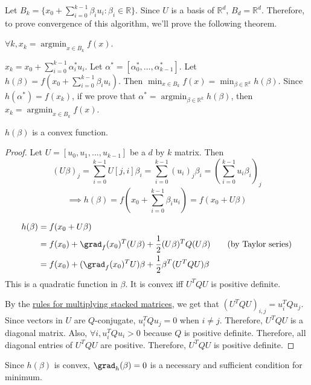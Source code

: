 Let $B_k = \{x_0 + \sum_{i=0}^{k-1} \beta_i u_i : \beta_i \in \mathbb{R} \}$.
Since $U$ is a basis of $\mathbb{R}^d$, $B_d = \mathbb{R}^d$.
Therefore, to prove convergence of this algorithm,
we'll prove the following theorem.

\begin{theorem}
\label{thm:exp-subsp}
$\forall k, x_k = \operatorname{argmin}_{x \in B_k} f(x)$.
\end{theorem}

$x_k = x_0 + \sum_{i=0}^{k-1} \alpha_i^* u_i$.
Let $\alpha^* = [\alpha_0^*, \ldots, \alpha_{k-1}^*]$.
Let $h(\beta) = f(x_0 + \sum_{i=0}^{k-1} \beta_i u_i)$.
Then $\min_{x \in B_k} f(x) = \min_{\beta \in \mathbb{R}^k} h(\beta)$.
Since $h(\alpha^*) = f(x_k)$, if we prove that
$\alpha^* = \operatorname{argmin}_{\beta \in \mathbb{R}^k} h(\beta)$,
then $x_k = \operatorname{argmin}_{x \in B_k} f(x)$.

\begin{lemma} $h(\beta)$ is a convex function. \end{lemma}
\begin{proof}
Let $U = [u_0, u_1, \ldots, u_{k-1}]$ be a $d$ by $k$ matrix. Then
\[ (U\beta)_j = \sum_{i=0}^{k-1} U[j, i] \beta_i
= \sum_{i=0}^{k-1} (u_i)_j \beta_i = \left( \sum_{i=0}^{k-1} u_i \beta_i \right)_j \]
\[ \implies h(\beta) = f\left(x_0 + \sum_{i=0}^{k-1} \beta_i u_i \right) = f(x_0 + U\beta) \]

\begin{align*}
h(\beta) &= f(x_0 + U\beta)
\\ &= f(x_0) + \grad_f(x_0)^T(U\beta) + \frac{1}{2}(U\beta)^T Q (U\beta) \tag{by Taylor series}
\\ &= f(x_0) + (\grad_f(x_0)^TU)\beta + \frac{1}{2}\beta^T (U^TQU) \beta
\end{align*}
This is a quadratic function in $\beta$.
It is convex iff $U^TQU$ is positive definite.

By the \href{https://sharmaeklavya2.github.io/theoremdep/nodes/linear-algebra/matrices/stacking/product.html}
{rules for multiplying stacked matrices}, we get that $(U^TQU)_{i,j} = u_i^TQu_j$.
Since vectors in $U$ are $Q$-conjugate, $u_i^TQu_j = 0$ when $i \neq j$.
Therefore, $U^TQU$ is a diagonal matrix.
Also, $\forall i, u_i^TQu_i > 0$ because $Q$ is positive definite.
Therefore, all diagonal entries of $U^TQU$ are positive.
Therefore, $U^TQU$ is positive definite.
\end{proof}

Since $h(\beta)$ is convex, $\grad_h(\beta) = 0$ is a necessary and sufficient condition for minimum.

